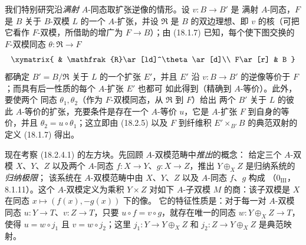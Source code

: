 \begin{env}[18.2.6]
\label{0.18.2.6-fr}
我们特别研究沿\emph{满射} $A$-同态取扩张逆像的情形。设 $v:B\to B'$ 是
满射 $A$-同态，$F$ 是 $B$ 关于 $B$-双模 $L$ 的一个 $A$-扩张，并设
$\mathfrak{R}$ 是 $B$ 的双边理想、即 $v$ 的核（可把它看作
$F$-双模，所借助的增广为 $F\to B$）；由 (18.1.7) 已知，每个使下图交换的
$F$-双模同态 $\theta:\mathfrak{R}\to F$
\[
  \xymatrix{
    & \mathfrak{R}\ar[ld]^\theta\ar[d]\\
    F\ar[r] & B
  }
\]
都确定 $B'=B/\mathfrak{R}$ 关于 $L$ 的一个扩张 $E'$，并且 $E'$ 沿
$v:B\to B'$ 的逆像等价于 $F$；而具有后一性质的每个 $A$-扩张 $E'$ 也都可
如此得到（精确到 $A$-等价）。此外，要使两个
同态 $\theta_1,\theta_2$（作为 $F$-双模同态，从 $\mathfrak{R}$ 到 $F$）给出
两个 $B'$ 关于 $L$ 的彼此 $A$-等价的扩张，充要条件是存在一个
$A$-等价 $u$，它是 $A$-扩张 $F$ 到自身的等价，并且
$\theta_2=u\circ\theta_1$；这立即由 (18.2.5) 以及 $F$ 到纤维积
$E'\times_{B'}B$ 的典范双射的定义 (18.1.7) 得出。
\end{env}

\begin{env}[18.2.7]
\label{0.18.2.7-fr}
现在考察 (18.2.4.1) 的左方块。先回顾 $A$-双模范畴中\emph{推出}的概念：
给定三个 $A$-双模 $X$、$Y$、$Z$ 以及两个 $A$-同态
$f:X\to Y$、$g:X\to Z$，推出 $Y\oplus_XZ$ 是归纳系统的\emph{归纳极限}；
该系统在 $A$-双模范畴中由 $X$、$Y$、$Z$ 以及 $A$-同态 $f$、$g$ 构成
（$0_{\mathrm{III}}$，8.1.11）。这个 $A$-双模定义为乘积 $Y\times Z$ 对如下
$A$-子双模 $M$ 的商：该子双模是 $X$ 在同态 $x\mapsto(f(x),-g(x))$ 下的像。
它的特征性质是：对于每一对 $A$-双模同态 $u:Y\to T$、$v:Z\to T$，只要
$u\circ f=v\circ g$，就存在唯一的同态 $w:Y\oplus_XZ\to T$，使得
$u=w\circ j_1$ 且 $v=w\circ j_2$；这里
$j_1:Y\to Y\oplus_XZ$ 和 $j_2:Z\to Y\oplus_XZ$ 是典范映射。
\end{env}


